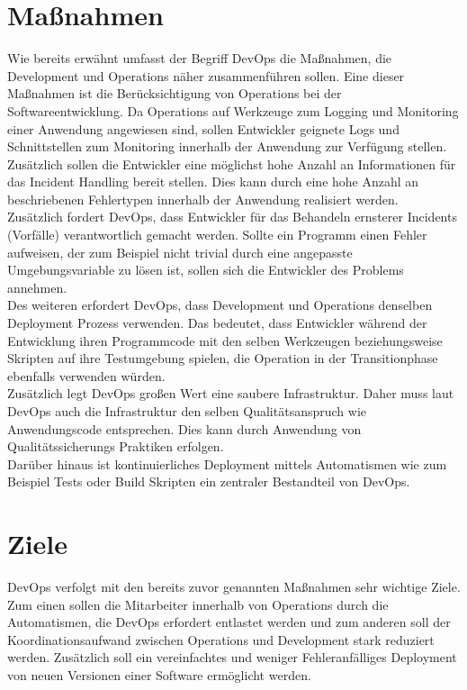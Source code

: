 \section{Maßnahmen}
Wie bereits erwähnt umfasst der Begriff DevOps die Maßnahmen, die Development und Operations näher zusammenführen sollen. Eine dieser Maßnahmen ist die Berücksichtigung von Operations bei der Softwareentwicklung. Da Operations auf Werkzeuge zum Logging und Monitoring einer Anwendung angewiesen sind, sollen Entwickler geignete Logs und Schnittstellen zum Monitoring innerhalb der Anwendung zur Verfügung stellen. Zusätzlich sollen die Entwickler eine möglichst hohe Anzahl an Informationen für das Incident Handling bereit stellen. Dies kann durch eine hohe Anzahl an beschriebenen Fehlertypen innerhalb der Anwendung realisiert werden. \\
Zusätzlich fordert DevOps, dass Entwickler für das Behandeln ernsterer Incidents (Vorfälle) verantwortlich gemacht werden. Sollte ein Programm einen Fehler aufweisen, der zum Beispiel nicht trivial durch eine angepasste Umgebungsvariable zu lösen ist, sollen sich die Entwickler des Problems annehmen. \\
Des weiteren erfordert DevOps, dass Development und Operations denselben Deployment Prozess verwenden. Das bedeutet, dass Entwickler während der Entwicklung ihren Programmcode mit den selben Werkzeugen beziehungsweise Skripten auf ihre Testumgebung spielen, die Operation  in der Transitionphase ebenfalls verwenden würden.\\
Zusätzlich legt DevOps großen Wert eine saubere Infrastruktur. Daher muss laut DevOps auch die Infrastruktur den selben Qualitätsanspruch wie Anwendungscode entsprechen. Dies kann durch Anwendung von Qualitätssicherungs Praktiken erfolgen. \\
Darüber hinaus ist kontinuierliches Deployment mittels Automatismen wie zum Beispiel Tests oder Build Skripten ein zentraler Bestandteil von DevOps.

\section{Ziele}
DevOps verfolgt mit den bereits zuvor genannten Maßnahmen sehr wichtige Ziele. Zum einen sollen die Mitarbeiter innerhalb von Operations durch die Automatismen, die DevOps erfordert entlastet werden und zum anderen soll der Koordinationsaufwand zwischen Operations und Development stark reduziert werden. Zusätzlich soll ein vereinfachtes und weniger Fehleranfälliges Deployment von neuen Versionen einer Software ermöglicht werden.
